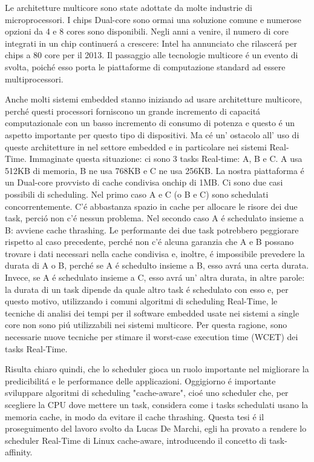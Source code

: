 Le architetture multicore sono state adottate da molte industrie di microprocessori. I chips Dual-core sono ormai una soluzione comune e numerose opzioni da
4 e 8 cores sono disponibili. Negli anni a venire, il numero di core integrati in un chip continuer\'a a crescere: Intel ha annunciato che rilascer\'a per
chips a 80 core per il 2013. Il passaggio alle tecnologie multicore \'e un evento di svolta, poich\'e esso porta le piattaforme di computazione standard ad
essere multiprocessori. 

Anche molti sistemi embedded stanno iniziando ad usare architetture multicore, perch\'e questi processori forniscono un grande incremento di capacit\'a 
computazionale con un basso incremento di consumo di potenza e questo \'e un aspetto importante per questo tipo di dispositivi. Ma c\'e un' ostacolo 
all' uso di queste architetture in nel settore embedded e in particolare nei sistemi Real-Time. Immaginate questa situazione: ci sono 3 tasks Real-time: A, 
B e C. A usa 512KB di memoria, B ne usa 768KB e C ne usa 256KB. La nostra piattaforma \'e un Dual-core provvisto di cache condivisa onchip di 1MB. Ci sono 
due casi possibili di scheduling. Nel primo caso A e C (o B e C) sono schedulati concorrentemente. C'\'e abbastanza spazio in cache per allocare le risore
dei due task, perci\'o non c'\'e nessun problema. Nel secondo caso A \'e schedulato insieme a B: avviene cache thrashing. Le performante dei due task 
potrebbero peggiorare rispetto al caso precedente, perch\'e non c'\'e alcuna garanzia che A e B possano trovare i dati necessari nella cache condivisa e, 
inoltre, \'e impossibile prevedere la durata di A o B, perch\'e se A \'e schedulto insieme a B, esso avr\'a una certa durata. Invece, se A \'e schedulato 
insieme a C, esso avr\'a un' altra durata, in altre parole: la durata di un task dipende da quale altro task \'e schedulato con esso e, per questo motivo, 
utilizzando i comuni algoritmi di scheduling Real-Time, le tecniche di analisi dei tempi per il software embedded usate nei sistemi a 
single core non sono pi\'u utilizzabili nei sistemi multicore. Per questa ragione, sono necessarie nuove tecniche per stimare il worst-case execution time
(WCET) dei tasks Real-Time. 

Risulta chiaro quindi, che lo scheduler gioca un ruolo importante nel migliorare la predicibilit\'a e le performance delle applicazioni. Oggigiorno \'e 
importante sviluppare algoritmi di scheduling "cache-aware", cio\'e uno scheduler che, per scegliere la CPU dove mettere un task, considera come i tasks 
schedulati usano la memoria cache, in modo da evitare il cache thrashing. Questa tesi \'e il proseguimento del lavoro svolto da Lucas De Marchi, egli ha 
provato a rendere lo scheduler Real-Time di Linux cache-aware, introducendo il concetto di task-affinity.

